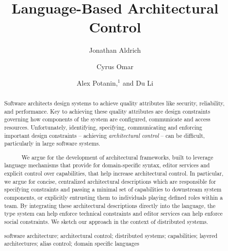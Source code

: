 \documentclass[runningheads]{llncs}
\newcommand{\keywords}[1]{\par\addvspace\baselineskip
\noindent\keywordname\enspace\ignorespaces#1}
\begin{document}
\title{Language-Based Architectural Control}
\author{Jonathan Aldrich \and Cyrus Omar \and Alex Potanin,$^{1}$ and Du Li}
\setlength{\abovecaptionskip}{0pt}
\setlength{\belowcaptionskip}{0pt}

\maketitle

\begin{sloppypar}
\begin{abstract}
Software architects design systems to achieve quality attributes like security, reliability, and performance. Key to achieving these quality attributes are design constraints governing how components of the system  are configured, communicate and access resources. Unfortunately, identifying, specifying, communicating and enforcing important design  constraints -- achieving \emph{architectural control} -- can be difficult, particularly in large software systems.

~~~~~~We argue for the development of architectural frameworks, built to leverage language mechanisms that provide for domain-specific syntax, editor services and explicit control over capabilities, that help increase architectural control. In particular, we argue for concise, centralized architectural descriptions which are responsible for specifying constraints and passing a minimal set of capabilities to downstream system components, or explicitly entrusting them to individuals playing defined roles within a team. By integrating these architectural descriptions directly into the language, the type system can help enforce technical constraints and editor services can help enforce social constraints. We sketch our approach in the context of distributed systems.

\keywords{software architecture;
architectural control;
distributed systems;
capabilities;
layered architectures;
alias control;
domain specific languages}

\end{abstract}


\end{sloppypar}
\end{document}
